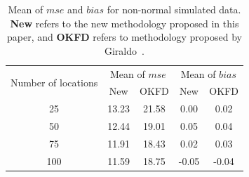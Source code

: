 \documentclass[]{interact}
\theoremstyle{plain}%
\theoremstyle{definition}
\theoremstyle{remark}
\begin{document}
\begin{table}[htbp]
  \centering
  \caption{Mean of $mse$ and $bias$ for non-normal simulated data. \textbf{New} refers to the new methodology proposed in this paper, and \textbf{OKFD} refers to methodology proposed by Giraldo~\cite{giraldo2011ordinary}.}
    \begin{tabular}{ccc|cc}
    \toprule
    \multirow{2}{*}{Number of locations} & \multicolumn{2}{c}{Mean of $mse$} & \multicolumn{2}{|c}{Mean of $bias$} \\ \cmidrule{2-5}
          & New   & OKFD  & New   & OKFD \\  \midrule
    25    & 13.23 & 21.58 & 0.00  & 0.02 \\
    50    & 12.44 & 19.01 & 0.05  & 0.04 \\
    75    & 11.91 & 18.43 & 0.02  & 0.03 \\
    100   & 11.59 & 18.75 & -0.05 & -0.04 \\ \bottomrule
    \end{tabular}
  \label{tab:summary-nonnormal}
\end{table}
\end{document}
